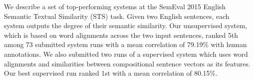 We describe a set of top-performing systems at the SemEval 2015 English Semantic Textual Similarity (STS) task. Given two English sentences, each system outputs the degree of their semantic similarity. Our unsupervised system, which is based on word alignments across the two input sentences, ranked 5th among 73 submitted system runs with a mean correlation of 79.19\% with human annotations. We also submitted two runs of a supervised system which uses word alignments and similarities between compositional sentence vectors as its features. Our best supervised run ranked 1st with a mean correlation of 80.15\%.
